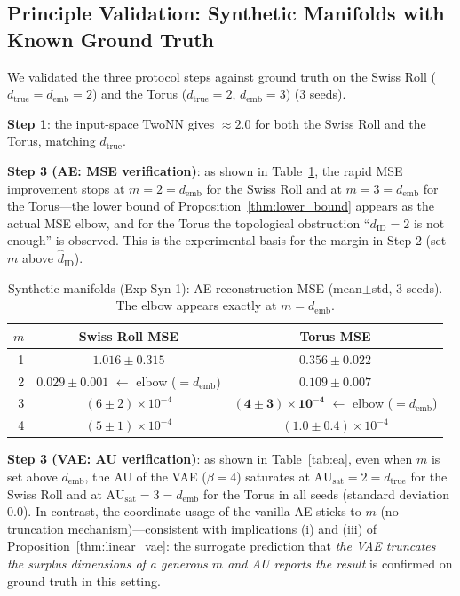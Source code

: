 \documentclass[make,article,submit,pdftex,moreauthors]{Definitions/mdpi}
\newcommand{\dID}{d_{\mathrm{ID}}}
\newcommand{\hatdID}{\hat{d}_{\mathrm{ID}}}
\newcommand{\dtrue}{d_{\mathrm{true}}}
\newcommand{\AUsat}{\mathrm{AU}_{\mathrm{sat}}}
\newcommand{\demb}{d_{\mathrm{emb}}}
\begin{document}
\subsection{Principle Validation: Synthetic Manifolds with Known Ground Truth}\label{sec:exp_syn}

We validated the three protocol steps against ground truth on the Swiss Roll
($\dtrue = \demb = 2$) and the Torus ($\dtrue = 2$, $\demb = 3$)
(3 seeds).

\textbf{Step 1}: the input-space TwoNN gives $\approx 2.0$ for both the
Swiss Roll and the Torus, matching $\dtrue$.

\textbf{Step 3 (AE: MSE verification)}: as shown in Table~\ref{tab:e1}, the
rapid MSE improvement stops at $m = 2 = \demb$ for the Swiss Roll and at
$m = 3 = \demb$ for the Torus---the lower bound of
Proposition~\ref{thm:lower_bound} appears as the actual MSE elbow, and for
the Torus the topological obstruction ``$\dID = 2$ is not enough'' is
observed.
This is the experimental basis for the margin in Step 2 (set $m$ above
$\hatdID$).

\begin{table}[H]
\caption{Synthetic manifolds (Exp-Syn-1): AE reconstruction MSE
(mean$\pm$std, 3 seeds). The elbow appears exactly at $m = \demb$.}
\label{tab:e1}
\small
\begin{tabular}{rcc}
\toprule
$m$ & \textbf{Swiss Roll MSE} & \textbf{Torus MSE} \\
\midrule
1 & $1.016 \pm 0.315$ & $0.356 \pm 0.022$ \\
2 & $\boldsymbol{0.029 \pm 0.001}$ $\leftarrow$ elbow ($= \demb$) & $0.109 \pm 0.007$ \\
3 & $(6 \pm 2) \times 10^{-4}$ & $\boldsymbol{(4 \pm 3) \times 10^{-4}}$ $\leftarrow$ elbow ($= \demb$) \\
4 & $(5 \pm 1) \times 10^{-4}$ & $(1.0 \pm 0.4) \times 10^{-4}$ \\
\bottomrule
\end{tabular}
\end{table}

\textbf{Step 3 (VAE: AU verification)}: as shown in Table~\ref{tab:ea},
even when $m$ is set above $\demb$, the AU of the VAE ($\beta = 4$)
saturates at $\AUsat = 2 = \dtrue$ for the Swiss Roll and at
$\AUsat = 3 = \demb$ for the Torus in all seeds (standard deviation 0.0).
In contrast, the coordinate usage of the vanilla AE sticks to $m$ (no
truncation mechanism)---consistent with implications (i) and (iii) of
Proposition~\ref{thm:linear_vae}: the surrogate prediction that \textit{the
VAE truncates the surplus dimensions of a generous $m$ and AU reports the
result} is confirmed on ground truth in this setting.
\end{document}
